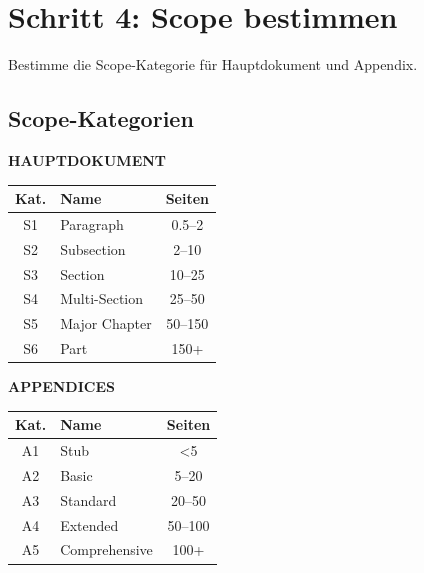 \documentclass[12pt,a4paper]{article}
\begin{document}
\section{Schritt 4: Scope bestimmen}

\begin{tcolorbox}[colback=gray!5!white, colframe=gray!75!black,
    title=\textbf{Schritt 4: Wie viel Raum bekommt das Thema?}]

Bestimme die Scope-Kategorie für Hauptdokument und Appendix.

\end{tcolorbox}

\subsection{Scope-Kategorien}

\begin{table}[htbp]
\centering
\begin{minipage}{0.48\textwidth}
\centering
\textbf{HAUPTDOKUMENT}
\begin{tabular}{@{}clc@{}}
\toprule
\textbf{Kat.} & \textbf{Name} & \textbf{Seiten} \\
\midrule
S1 & Paragraph & 0.5--2 \\
S2 & Subsection & 2--10 \\
S3 & Section & 10--25 \\
S4 & Multi-Section & 25--50 \\
S5 & Major Chapter & 50--150 \\
S6 & Part & 150+ \\
\bottomrule
\end{tabular}
\end{minipage}
\hfill
\begin{minipage}{0.48\textwidth}
\centering
\textbf{APPENDICES}
\begin{tabular}{@{}clc@{}}
\toprule
\textbf{Kat.} & \textbf{Name} & \textbf{Seiten} \\
\midrule
A1 & Stub & <5 \\
A2 & Basic & 5--20 \\
A3 & Standard & 20--50 \\
A4 & Extended & 50--100 \\
A5 & Comprehensive & 100+ \\
\bottomrule
\end{tabular}
\end{minipage}
\end{table}
\end{document}
